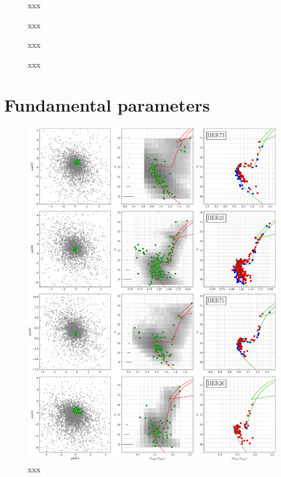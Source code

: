 \documentclass[draft]{aa}
\begin{document}
\begin{appendix}
 \begin{figure}
  \caption{xxx}
  \label{fig:8struct}
 \end{figure}

 \begin{figure}
  \caption{xxx}
  \label{fig:12struct}
 \end{figure}

 \begin{figure}
  \caption{xxx}
  \label{fig:16struct}
 \end{figure}

 \begin{figure}
  \caption{xxx}
  \label{fig:20struct}
 \end{figure}


\section{Fundamental parameters}
\label{app:fundam_params}

 \begin{figure}[t]
  \centering
  \includegraphics[height=.95\textheight]{figs/0_fpars.png}
  \caption{xxx}
  \label{fig:0fpars}
 \end{figure}


\end{appendix}
\end{document}
